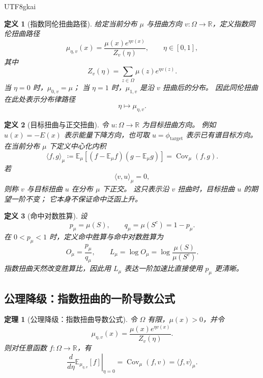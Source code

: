 \documentclass[12pt]{article}
\newtheorem{definition}{定义}[section]
\newtheorem{theorem}{定理}[section]
\newcommand{\DefEq}{\coloneqq}
\begin{document}
\begin{CJK*}{UTF8}{gkai}
\begin{definition}[指数同伦扭曲路径]
\label{def:tex55-orthogonal-exponential-twist}
给定当前分布 \(\mu\) 与扭曲方向 \(v:\Omega\to\mathbb R\)，定义指数同伦扭曲路径
\[
  \mu_{\eta,v}(x)
  =
  \frac{\mu(x)e^{\eta v(x)}}{Z_v(\eta)},
  \qquad
  \eta\in[0,1],
\]
其中
\[
  Z_v(\eta)
  =
  \sum_{z\in\Omega}\mu(z)e^{\eta v(z)}.
\]
当 \(\eta=0\) 时，\(\mu_{0,v}=\mu\)；
当 \(\eta=1\) 时，\(\mu_{1,v}\) 是沿 \(v\) 扭曲后的分布。
因此同伦扭曲在此处表示分布律路径
\[
  \eta\mapsto\mu_{\eta,v}.
\]
\end{definition}

\begin{definition}[目标扭曲与正交扭曲]
\label{def:tex55-orthogonal-target}
令 \(u:\Omega\to\mathbb R\) 为目标扭曲方向。
例如 \(u(x)=-E(x)\) 表示能量下降方向，也可取 \(u=\phi_{\mathrm{target}}\) 表示已有谱目标方向。
在当前分布 \(\mu\) 下定义中心化内积
\[
  \langle f,g\rangle_\mu
  \DefEq
  \mathbb E_\mu
  \left[
  (f-\mathbb E_\mu f)(g-\mathbb E_\mu g)
  \right]
  =
  \operatorname{Cov}_\mu(f,g).
\]
若
\[
  \langle v,u\rangle_\mu=0,
\]
则称 \(v\) 与目标扭曲 \(u\) 在分布 \(\mu\) 下正交。
这只表示沿 \(v\) 扭曲时，目标扭曲 \(u\) 的期望一阶不变；
它本身不保证命中泛函上升。
\end{definition}

\begin{definition}[命中对数胜算]
\label{def:tex55-orthogonal-log-odds}
设
\[
  p_\mu=\mu(S),
  \qquad
  q_\mu=\mu(S^c)=1-p_\mu.
\]
在 \(0<p_\mu<1\) 时，定义命中胜算与命中对数胜算为
\[
  O_\mu
  =
  \frac{p_\mu}{q_\mu},
  \qquad
  L_\mu
  =
  \log O_\mu
  =
  \log\frac{\mu(S)}{\mu(S^c)}.
\]
指数扭曲天然改变胜算比，因此用 \(L_\mu\) 表达一阶加速比直接使用 \(p_\mu\) 更清晰。
\end{definition}

\subsection{公理降级：指数扭曲的一阶导数公式}
\label{subsec:tex55-orthogonal-axiom-downgrade}

\begin{theorem}[公理降级：指数扭曲导数公式]
\label{thm:tex55-exponential-twist-derivative}
令 \(\Omega\) 有限，\(\mu(x)>0\)，并令
\[
  \mu_{\eta,v}(x)
  =
  \frac{\mu(x)e^{\eta v(x)}}{Z_v(\eta)}.
\]
则对任意函数 \(f:\Omega\to\mathbb R\)，有
\[
  \left.
  \frac{d}{d\eta}
  \mathbb E_{\mu_{\eta,v}}[f]
  \right|_{\eta=0}
  =
  \operatorname{Cov}_\mu(f,v)
  =
  \langle f,v\rangle_\mu.
\]
\end{theorem}


\end{CJK*}
\end{document}
